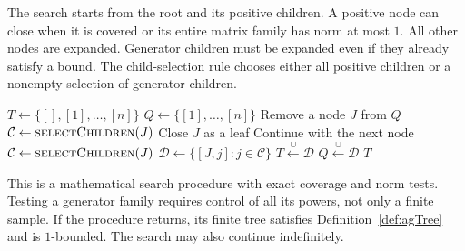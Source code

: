 The search starts from the root and its positive children.
A positive node can close when it is covered or its entire matrix family has norm at most $1$.
All other nodes are expanded.
Generator children must be expanded even if they already satisfy a bound.
The child-selection rule chooses either all positive children or a nonempty selection of generator children.

\begin{algorithm}[ht]
    \caption{Finite-tree certificate search}
    \label{alg:finiteTree}
    \begin{algorithmic}
        \State {}
        \State $T\gets\{[],[1],\dots,[n]\}$
        \State $Q\gets\{[1],\dots,[n]\}$
            \State Remove a node $J$ from $Q$
                \State $\mathcal{C}\gets\textproc{selectChildren}(J)$
                \State Close $J$ as a leaf
                \State Continue with the next node
            \Else
                \State $\mathcal{C}\gets\textproc{selectChildren}(J)$
            \EndIf
            \State $\mathcal{D}\gets\{[J,j]:j\in\mathcal{C}\}$
            \State $T\xleftarrow{\cup}\mathcal{D}$
            \State $Q\xleftarrow{\cup}\mathcal{D}$
        \EndWhile
        \State \Return $T$
    \end{algorithmic}
\end{algorithm}

This is a mathematical search procedure with exact coverage and norm tests.
Testing a generator family requires control of all its powers, not only a finite sample.
If the procedure returns, its finite tree satisfies Definition~\ref{def:agTree} and is $1$-bounded.
The search may also continue indefinitely.

